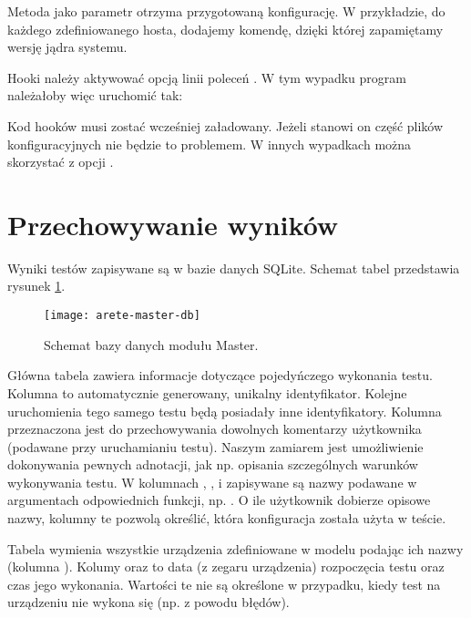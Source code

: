 \documentclass[00-praca-magisterska.tex]{subfiles}
\begin{document}
Metoda  jako parametr otrzyma przygotowaną
konfigurację. W przykładzie, do każdego zdefiniowanego hosta, dodajemy komendę,
dzięki której zapamiętamy wersję jądra systemu.

Hooki należy aktywować opcją linii poleceń . W tym wypadku
program należałoby więc uruchomić tak:

\begin{textcode}
\end{textcode}

Kod hooków musi zostać wcześniej załadowany. Jeżeli stanowi on część plików
konfiguracyjnych nie będzie to problemem. W innych wypadkach można skorzystać z
opcji .

\section{Przechowywanie wyników}

Wyniki testów zapisywane są w bazie danych SQLite. Schemat tabel przedstawia
rysunek \ref{fig:arete-master-db}.

\begin{figure}[htb]
\begin{center}
\leavevmode
\texttt{[image: arete-master-db]}
\end{center}
\caption{Schemat bazy danych modułu Master.}
\label{fig:arete-master-db}
\end{figure}

Główna tabela  zawiera informacje dotyczące pojedyńczego wykonania
testu. Kolumna  to automatycznie generowany, unikalny identyfikator.
Kolejne uruchomienia tego samego testu będą posiadały inne identyfikatory.
Kolumna  przeznaczona jest do przechowywania dowolnych komentarzy
użytkownika (podawane przy uruchamianiu testu). Naszym zamiarem jest
umożliwienie dokonywania pewnych adnotacji, jak np. opisania szczególnych
warunków wykonywania testu. W kolumnach , ,
 i  zapisywane są nazwy podawane w argumentach
odpowiednich funkcji, np. . O ile użytkownik
dobierze opisowe nazwy, kolumny te pozwolą określić, która konfiguracja została
użyta w teście.

Tabela  wymienia wszystkie urządzenia zdefiniowane w modelu podając
ich nazwy (kolumna ). Kolumy  oraz 
to data (z zegaru urządzenia) rozpoczęcia testu oraz czas jego wykonania.
Wartości te nie są określone w przypadku, kiedy test na urządzeniu nie wykona
się (np. z powodu błędów).
\end{document}
